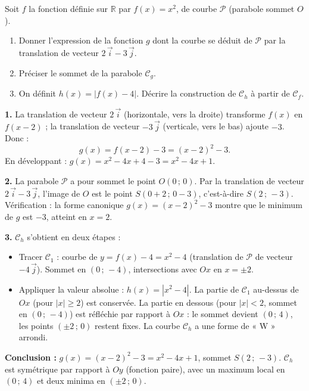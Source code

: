 \documentclass[11pt]{article}
\begin{document}
\begin{exoresolu}
Soit $f$ la fonction définie sur $\mathbb{R}$ par $f(x) = x^2$, de courbe $\mathcal{P}$ (parabole sommet $O$).
\begin{enumerate}
\item Donner l'expression de la fonction $g$ dont la courbe se déduit de $\mathcal{P}$ par la translation de vecteur $2\,\vec{i} - 3\,\vec{j}$.
\item Préciser le sommet de la parabole $\mathcal{C}_g$.
\item On définit $h(x) = |f(x) - 4|$. Décrire la construction de $\mathcal{C}_h$ à partir de $\mathcal{C}_f$.
\end{enumerate}
\tcblower
\textbf{1.} La translation de vecteur $2\,\vec{i}$ (horizontale, vers la droite) transforme $f(x)$ en $f(x - 2)$ ; la translation de vecteur $-3\,\vec{j}$ (verticale, vers le bas) ajoute $-3$. Donc :
\[ g(x) = f(x - 2) - 3 = (x - 2)^2 - 3. \]
En développant : $g(x) = x^2 - 4x + 4 - 3 = x^2 - 4x + 1$.

\textbf{2.} La parabole $\mathcal{P}$ a pour sommet le point $O(0\,;\,0)$. Par la translation de vecteur $2\,\vec{i} - 3\,\vec{j}$, l'image de $O$ est le point $S(0 + 2\,;\,0 - 3)$, c'est-à-dire $S(2\,;\,-3)$.
Vérification : la forme canonique $g(x) = (x-2)^2 - 3$ montre que le minimum de $g$ est $-3$, atteint en $x = 2$.

\textbf{3.} $\mathcal{C}_h$ s'obtient en deux étapes :
\begin{itemize}
\item Tracer $\mathcal{C}_1$ : courbe de $y = f(x) - 4 = x^2 - 4$ (translation de $\mathcal{P}$ de vecteur $-4\,\vec{j}$). Sommet en $(0\,;\,-4)$, intersections avec $Ox$ en $x = \pm 2$.
\item Appliquer la valeur absolue : $h(x) = |x^2 - 4|$. La partie de $\mathcal{C}_1$ au-dessus de $Ox$ (pour $|x| \geq 2$) est conservée. La partie en dessous (pour $|x| < 2$, sommet en $(0\,;\,-4)$) est réfléchie par rapport à $Ox$ : le sommet devient $(0\,;\,4)$, les points $(\pm 2\,;\,0)$ restent fixes. La courbe $\mathcal{C}_h$ a une forme de « W » arrondi.
\end{itemize}

\textbf{Conclusion :} $g(x) = (x-2)^2 - 3 = x^2 - 4x + 1$, sommet $S(2\,;\,-3)$. $\mathcal{C}_h$ est symétrique par rapport à $Oy$ (fonction paire), avec un maximum local en $(0\,;\,4)$ et deux minima en $(\pm 2\,;\,0)$.
\end{exoresolu}
\end{document}

